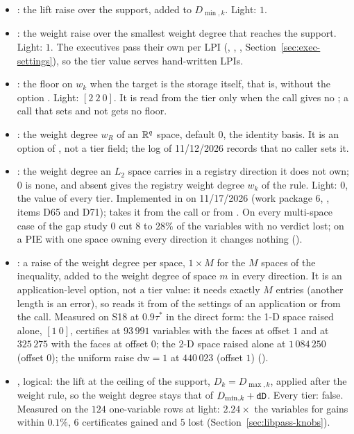 \begin{itemize}\setlength\itemsep{0pt}
\item {}: the lift raise over the support, added to $D_{\min,k}$. Light: $1$.
\item {}: the weight raise over the smallest weight degree that reaches the support. Light: $1$. The executives pass their own  per LPI (, , , Section~\ref{sec:exec-settings}), so the tier value serves hand-written LPIs.
\item {}: the floor on $w_k$ when the target is the storage itself, that is, without the option . Light: $[2\ 2\ 0]$. It is read from the tier only when the call gives no ; a call that sets  and not  gets no floor.
\item {}: the weight degree $w_R$ of an $\mathbb{R}^q$ space, default $0$, the identity basis. It is an option of , not a tier field; the  log of 11/12/2026 records that no caller sets it.
\item {}: the weight degree an $L_2$ space carries in a registry direction it does not own; $0$ is none, and absent gives the registry weight degree $w_k$ of the rule. Light: $0$, the value of every tier. Implemented in  on 11/17/2026 (work package 6, , items D65 and D71);  takes it from the call or from . On every multi-space case of the gap study $0$ cut $8$ to $28\%$ of the variables with no verdict lost; on a PIE with one space owning every direction it changes nothing (\gapsref).
\item {}: a raise of the weight degree per space, $1\times M$ for the $M$ spaces of the inequality, added to the weight degree of space $m$ in every direction. It is an application-level option, not a tier value: it needs exactly $M$ entries (another length is an error), so  reads it from  of the settings of an application or from the call. Measured on S18 at $0.9\tau^*$ in the direct form: the 1-D space raised alone, $[1\ 0]$, certifies at $93\,991$ variables with the faces at offset $1$ and at $325\,275$ with the faces at offset $0$; the 2-D space raised alone at $1\,084\,250$ (offset $0$); the uniform raise $\mathrm{dw}=1$ at $440\,023$ (offset $1$) ().
\item {}, logical: the lift at the ceiling of the support, $D_k=D_{\max,k}$, applied after the weight rule, so the weight degree stays that of $D_{\min,k}+\texttt{dD}$. Every tier: false. Measured on the $124$ one-variable rows at light: $2.24\times$ the variables for gains within $0.1\%$, $6$ certificates gained and $5$ lost (Section~\ref{sec:libpass-knobs}).

\end{itemize}
